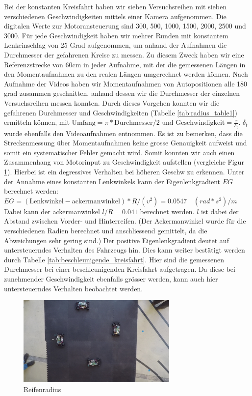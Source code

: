\documentclass[10pt]{article}
\begin{document}
    Bei der konstanten Kreisfahrt haben wir sieben Versuchsreihen mit sieben verschiedenen Geschwindigkeiten mittels einer Kamera aufgenommen.
    Die digitalen Werte zur Motoransteuerung sind 300, 500, 1000, 1500, 2000, 2500 und 3000.
    Für jede Geschwindigkeit haben wir mehrer Runden mit konstantem Lenkeinschlag von 25 Grad aufgenommen, um anhand der Aufnahmen die Durchmesser der gefahrenen Kreise zu messen.
    Zu diesem Zweck haben wir eine Referenzstrecke von 60cm in jeder Aufnahme, mit der die gemessenen Längen in den Momentaufnahmen zu den
    realen Längen umgerechnet werden können. Nach Aufnahme der Videos haben wir Momentaufnahmen von Autopositionen alle 180 grad zusammen geschnitten,
    anhand dessen wir die Durchmesser der einzelnen Versuchsreihen messen konnten. Durch dieses Vorgehen konnten wir die gefahrenen Durchmesser und Geschwindigkeiten (Tabelle \ref{tab:radius_table1}) ermitteln können, mit $\text{Umfang} = \pi*\text{Durchmesser}/2$ und $\text{Geschwindigkeit} = \frac{x}{\delta_t}$. $\delta_t$ wurde ebenfalls den Videoaufnahmen entnommen.
    Es ist zu bemerken, dass die Streckenmessung über Momentaufnahmen keine grosse Genauigkeit aufweist und somit ein systematischer Fehler gemacht wird.
    Somit konnten wir auch einen Zusammenhang von Motorinput zu Geschwindigkeit aufstellen (vergleiche Figur \ref{fig:reifenradius}). Hierbei ist ein degressives Verhalten bei höheren Geschw zu erkennen.
    Unter der Annahme eines konstanten Lenkwinkels kann der Eigenlenkgradient $EG$ berechnet werden:
    $EG=(\text{Lenkwinkel}-\text{ackermanwinkel})*R/(v^2)=0.0547\quad (rad*s^2)/m$
    Dabei kann der ackermanwinkel  $l/R = 0.041$ berechnet werden. $l$ ist dabei der Abstand zwischen Vorder- und Hinterreifen.
    (Der Ackermanwinkel wurde für die verschiedenen Radien berechnet und anschliessend gemittelt, da die Abweichungen sehr gering sind.)
    Der positive Eigenlenkgradient deutet auf untersteuerndes Verhalten des Fahrzeugs hin. Dies kann weiter bestätigt werden durch Tabelle \ref{tab:beschleunigende_kreisfahrt}.
    Hier sind die gemessenen Durchmesser bei einer beschleunigenden Kreisfahrt aufgetragen. Da diese bei zunehmender Geschwindigkeit ebenfalls grösser werden, kann auch hier untersteuerndes Verhalten beobachtet werden.
\begin{figure}[hbtp]
        \centering
        \includegraphics[width=0.7\textwidth]{Dyn_Kreis_5678}
        \caption{Reifenradius}
        \label{fig:reifenradius}
    \end{figure}
\end{document}
